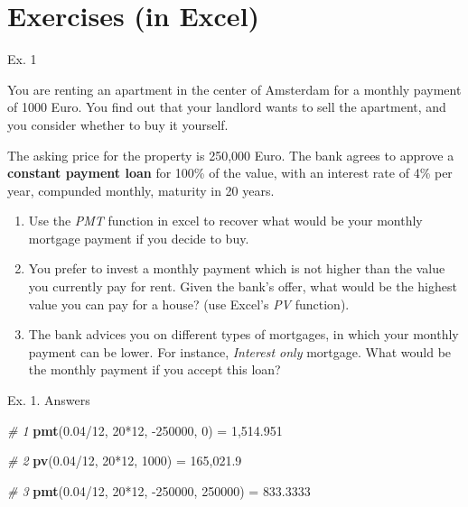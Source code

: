 \documentclass[ignorenonframetext,]{beamer}
\newenvironment{Shaded}{\begin{snugshade}}{\end{snugshade}}
\newcommand{\KeywordTok}[1]{\textcolor[rgb]{0.13,0.29,0.53}{\textbf{{#1}}}}
\newcommand{\DecValTok}[1]{\textcolor[rgb]{0.00,0.00,0.81}{{#1}}}
\newcommand{\FloatTok}[1]{\textcolor[rgb]{0.00,0.00,0.81}{{#1}}}
\newcommand{\StringTok}[1]{\textcolor[rgb]{0.31,0.60,0.02}{{#1}}}
\newcommand{\CommentTok}[1]{\textcolor[rgb]{0.56,0.35,0.01}{\textit{{#1}}}}
\newcommand{\NormalTok}[1]{{#1}}
\providecommand{\tightlist}{%
\setlength{\itemsep}{0pt}\setlength{\parskip}{0pt}}
\begin{document}
\section{Exercises (in Excel)}\label{exercises-in-excel}

\begin{frame}{Ex. 1}

\small

You are renting an apartment in the center of Amsterdam for a monthly
payment of 1000 Euro. You find out that your landlord wants to sell the
apartment, and you consider whether to buy it yourself.

The asking price for the property is 250,000 Euro. The bank agrees to
approve a \textbf{constant payment loan} for 100\% of the value, with an
interest rate of 4\% per year, compunded monthly, maturity in 20 years.

\begin{enumerate}
\def\labelenumi{\arabic{enumi}.}
\tightlist
\item
  Use the \emph{PMT} function in excel to recover what would be your
  monthly mortgage payment if you decide to buy.
\item
  You prefer to invest a monthly payment which is not higher than the
  value you currently pay for rent. Given the bank's offer, what would
  be the highest value you can pay for a house? (use Excel's \emph{PV}
  function).
\item
  The bank advices you on different types of mortgages, in which your
  monthly payment can be lower. For instance, \emph{Interest only}
  mortgage. What would be the monthly payment if you accept this loan?
\end{enumerate}

\normalsize

\end{frame}

\begin{frame}[fragile]{Ex. 1. Answers}

\begin{Shaded}
\begin{Highlighting}[]
\CommentTok{# 1 }
\KeywordTok{pmt}\NormalTok{(}\FloatTok{0.04}\NormalTok{/}\DecValTok{12}\NormalTok{, }\DecValTok{20}\NormalTok{*}\DecValTok{12}\NormalTok{, -}\DecValTok{250000}\NormalTok{, }\DecValTok{0}\NormalTok{)}
\NormalTok{=}\StringTok{ }\DecValTok{1}\NormalTok{,}\FloatTok{514.951}

\CommentTok{# 2}
\KeywordTok{pv}\NormalTok{(}\FloatTok{0.04}\NormalTok{/}\DecValTok{12}\NormalTok{, }\DecValTok{20}\NormalTok{*}\DecValTok{12}\NormalTok{, }\DecValTok{1000}\NormalTok{)}
\NormalTok{=}\StringTok{ }\DecValTok{165}\NormalTok{,}\FloatTok{021.9}

\CommentTok{# 3}
\KeywordTok{pmt}\NormalTok{(}\FloatTok{0.04}\NormalTok{/}\DecValTok{12}\NormalTok{, }\DecValTok{20}\NormalTok{*}\DecValTok{12}\NormalTok{, -}\DecValTok{250000}\NormalTok{, }\DecValTok{250000}\NormalTok{)}
\NormalTok{=}\StringTok{ }\FloatTok{833.3333}
\end{Highlighting}
\end{Shaded}

\end{frame}
\end{document}
